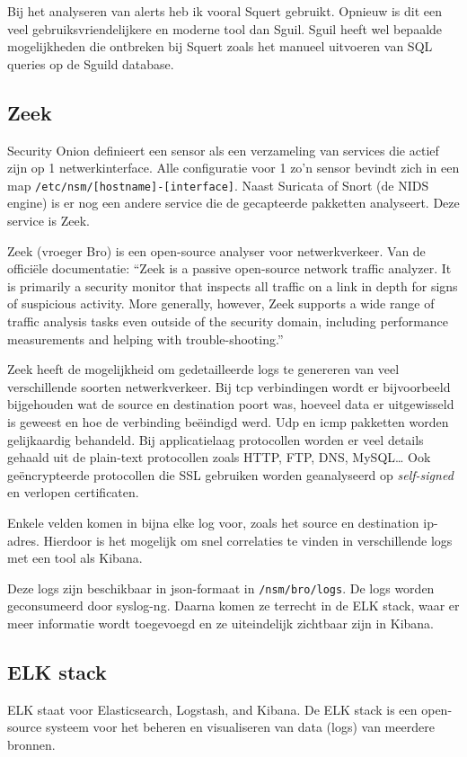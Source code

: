 \documentclass[a4paper,12pt]{report}
\begin{document}
Bij het analyseren van alerts heb ik vooral Squert gebruikt.
Opnieuw is dit een veel gebruiksvriendelijkere en moderne tool dan Sguil.
Sguil heeft wel bepaalde mogelijkheden die ontbreken bij Squert zoals het manueel uitvoeren van SQL queries op de Sguild database.

\subsection{Zeek}
Security Onion definieert een sensor als een verzameling van services die actief zijn op 1 netwerkinterface.
Alle configuratie voor 1 zo'n sensor bevindt zich in een map \lstinline|/etc/nsm/[hostname]-[interface]|.
Naast Suricata of Snort (de NIDS engine) is er nog een andere service die de gecapteerde pakketten analyseert.
Deze service is Zeek.

Zeek (vroeger Bro) is een open-source analyser voor netwerkverkeer.
Van de officiële documentatie:
``Zeek is a passive open-source network traffic analyzer.
It is primarily a security monitor that inspects all traffic on a link in depth for signs of suspicious activity.
More generally, however, Zeek supports a wide range of traffic analysis tasks even outside of the security domain, including performance measurements and helping with trouble-shooting.''
\autocite{zeek:docs}

Zeek heeft de mogelijkheid om gedetailleerde logs te genereren van veel verschillende soorten netwerkverkeer.
Bij tcp verbindingen wordt er bijvoorbeeld bijgehouden wat de source en destination poort was, hoeveel data er uitgewisseld is geweest en hoe de verbinding beëindigd werd.
Udp en icmp pakketten worden gelijkaardig behandeld.
Bij applicatielaag protocollen worden er veel details gehaald uit de plain-text protocollen zoals HTTP, FTP, DNS, MySQL\dots
Ook geëncrypteerde protocollen die SSL gebruiken worden geanalyseerd op \emph{self-signed} en verlopen certificaten.

Enkele velden komen in bijna elke log voor, zoals het source en destination ip-adres.
Hierdoor is het mogelijk om snel correlaties te vinden in verschillende logs met een tool als Kibana.

Deze logs zijn beschikbaar in json-formaat in \lstinline|/nsm/bro/logs|.
De logs worden geconsumeerd door syslog-ng.
Daarna komen ze terrecht in de ELK stack, waar er meer informatie wordt toegevoegd en ze uiteindelijk zichtbaar zijn in Kibana.
\autocite{so:docs}

\subsection{ELK stack}
ELK staat voor Elasticsearch, Logstash, and Kibana.
De ELK stack is een open-source systeem voor het beheren en visualiseren van data (logs) van meerdere bronnen.
\end{document}
